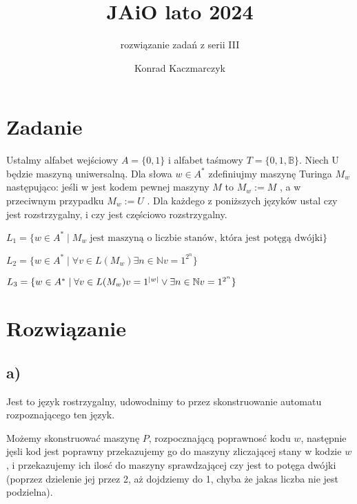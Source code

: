 \documentclass[11pt]{scrartcl}
\author{Konrad Kaczmarczyk}
\begin{document}
  \title{JAiO lato 2024}
  \subtitle{rozwiązanie zadań z serii III}
  \maketitle
    \section{Zadanie}
        \begin{zadanie}
            Ustalmy alfabet wejściowy $A = \{0, 1\}$ i alfabet taśmowy $T = \{0, 1, \mathbb{B} \}$. Niech U będzie maszyną uniwersalną. Dla słowa $w \in A^*$ zdefiniujmy maszynę Turinga $M_w$ następująco: jeśli w jest kodem pewnej maszyny $M$ to $M_w := M$ , a w przeciwnym przypadku $M_w := U$ . Dla każdego z poniższych języków ustal czy jest rozstrzygalny, i czy jest częściowo rozstrzygalny. 
            \begin{walk}
                \item $L_1 = \{ w \in A^* \mid M_w \; \text{jest maszyną o liczbie stanów, która jest potęgą dwójki} \}$
                \item $L_2 = \{ w \in A^* \mid \forall v \in L(M_w) \exists n \in \mathbb{N} v = 1^{2^n}  \}$
                \item $L_3 = \{ w \in A^* \mid \forall v \in L(M_w) v = 1^{\left\lvert w \right\rvert } \vee \exists n \in \mathbb{N} v = 1^{2^n}  \}$  
            \end{walk}
            
        \end{zadanie}
        
        \section{Rozwiązanie}

          \subsection{a)}
            
            Jest to język rostrzygalny, udowodnimy to przez skonstruowanie automatu rozpoznającego ten język.

            Możemy skonstruować maszynę $P$, rozpocznającą poprawnosć kodu $w$, następnie jęsli kod jest poprawny przekazujemy go do maszyny zliczającej stany w kodzie $w$, i przekazujemy ich ilosć do maszyny sprawdzającej czy jest to potęga dwójki (poprzez dzielenie jej przez 2, aż dojdziemy do 1, chyba że jakas liczba nie jest podzielna).
\end{document}
